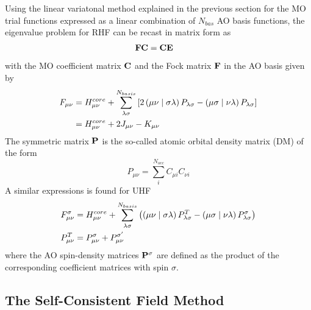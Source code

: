 \noindent Using the linear variatonal method explained in the previous section for the MO trial functions expressed as a linear combination of $N_{bas}$ AO basis functions, the eigenvalue problem for RHF can be recast in matrix form as
\begin{align}
\mathbf{F} \mathbf{C} &= \mathbf{C} \mathbf{E} 
\end{align}
\noindent with the MO coefficient matrix $\mathbf{C}$ and the Fock matrix $\mathbf{F}$ in the AO basis given by
\begin{align}
F_{\mu\nu} &= H^{core}_{\mu\nu} + \sum_{\lambda\sigma}^{N_{basis}} \left[ 2 \left( \mu\nu \mid \sigma\lambda \right) P_{\lambda\sigma} - \left( \mu\sigma \mid \nu\lambda \right) P_{\lambda\sigma} \right] \\
&= H^{core}_{\mu\nu} + 2 J_{\mu\nu} - K_{\mu\nu} 
\end{align}
\noindent The symmetric matrix $\mathbf{P}$ is the so-called atomic orbital density matrix (DM) of the form
\begin{equation}
P_{\mu\nu} = \sum_i^{N_{occ}} C_{\mu i} C_{\nu i} 
\end{equation}
\noindent A similar expressions is found for UHF
\begin{equation}
\begin{split}
F_{\mu\nu}^{\sigma} &= H^{core}_{\mu\nu} + \sum_{\lambda\sigma}^{N_{basis}} \left( \left( \mu\nu \mid \sigma\lambda \right) P^{T}_{\lambda\sigma} - \left( \mu\sigma \mid \nu\lambda \right) P^{\sigma}_{\lambda\sigma} \right) \\
P^T_{\mu\nu} &= P^{\sigma}_{\mu\nu} + P^{\sigma'}_{\mu\nu} 
\end{split}
\end{equation}
\noindent where the AO spin-density matrices $\mathbf{P}^{\sigma}$ are defined as the product of the corresponding coefficient matrices with spin $\sigma$.  

\subsection{The Self-Consistent Field Method}

